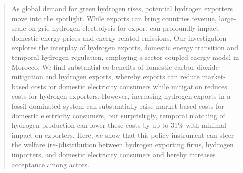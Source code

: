 \documentclass[5p,numafflabel]{elsarticle}
\begin{document}
\begin{frontmatter}
\begin{abstract}
As global demand for green hydrogen rises, potential hydrogen exporters move into the spotlight.
While exports can bring countries revenue, large-scale on-grid hydrogen electrolysis for export can profoundly impact domestic energy prices and energy-related emissions.
Our investigation explores the interplay of hydrogen exports, domestic energy transition and temporal hydrogen regulation, employing a sector-coupled energy model in Morocco. 
We find substantial co-benefits of domestic carbon dioxide mitigation and hydrogen exports, whereby exports can reduce market-based costs for domestic electricity consumers while mitigation reduces costs for hydrogen exporters.
However, increasing hydrogen exports in a fossil-dominated system can substantially raise market-based costs for domestic electricity consumers, but surprisingly, temporal matching of hydrogen production can lower these costs by up to 31\% with minimal impact on exporters.
Here, we show that this policy instrument can steer the welfare (re-)distribution between hydrogen exporting firms, hydrogen importers, and domestic electricity consumers and hereby increases acceptance among actors.

	\end{abstract}





\end{frontmatter}



\end{document}
